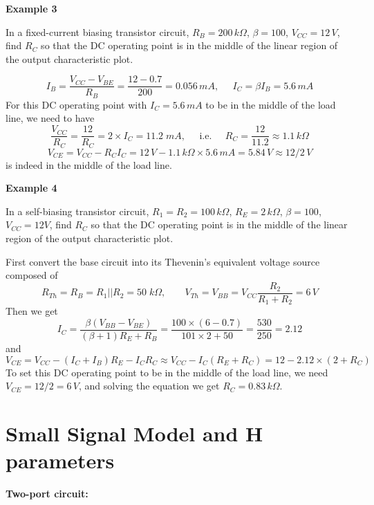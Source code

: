 {\bf Example 3}

In a fixed-current biasing transistor circuit, $R_B=200\,k\Omega$, $\beta=100$, 
$V_{CC}=12\,V$, find $R_C$ so that the DC operating point is in the middle
of the linear region of the output characteristic plot.

\[ 
I_B=\frac{V_{CC}-V_{BE}}{R_B}=\frac{12-0.7}{200}=0.056\,mA,\;\;\;\;\;
I_C=\beta I_B=5.6\,mA 
\]
For this DC operating point with $I_C=5.6\,mA$ to be in the middle of the
load line, we need to have 
\[ 
\frac{V_{CC}}{R_C}=\frac{12}{R_C}=2\times I_C=11.2\;mA,\;\;\;\;\;\mbox{i.e.}
\;\;\;\;\;R_C=\frac{12}{11.2}\approx 1.1\,k\Omega
\]
\[
V_{CE}=V_{CC}-R_CI_C=12\,V-1.1\,k\Omega\times 5.6\,mA=5.84\,V\approx 12/2\,V
\]
is indeed in the middle of the load line.

{\bf Example 4}

In a self-biasing transistor circuit, $R_1=R_2=100\,k\Omega$, $R_E=2\,k\Omega$, 
$\beta=100$, $V_{CC}=12V$, find $R_C$ so that the DC operating point is 
in the middle of the linear region of the output characteristic plot.

First convert the base circuit into its Thevenin's equivalent voltage 
source composed of
\[ 
R_{Th}=R_B=R_1||R_2=50\;k\Omega,\;\;\;\;\;\;\;V_{Th}=V_{BB}=V_{CC}\frac{R_2}{R_1+R_2}=6\,V 
\]
Then we get
\[ 
I_C=\frac{\beta(V_{BB}-V_{BE})}{(\beta+1)R_E+R_B}
=\frac{100\times(6-0.7)}{101\times 2+50}=\frac{530}{250}=2.12
\]
and
\[
V_{CE}=V_{CC}-(I_C+I_B) R_E-I_CR_C\approx V_{CC}-I_C(R_E+R_C)=12-2.12\times (2+R_C)
\]
To set this DC operating point to be in the middle of the load line, we need 
$V_{CE}=12/2=6\,V$, and solving the equation we get $R_C=0.83\,k\Omega$.



\section*{Small Signal Model and H parameters}

{\bf Two-port circuit:} 


